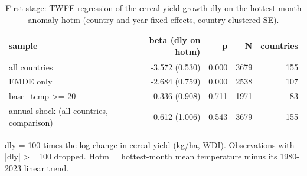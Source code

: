 \begin{table}[htbp]
\centering
\caption{First stage: TWFE regression of the cereal-yield growth dly on the hottest-month anomaly hotm (country and year fixed effects, country-clustered SE).}
\label{tab:agri_firststage}
\begin{tabular}{lrrrr}
\toprule
sample & beta (dly on hotm) & p & N & countries \\
\midrule
all countries & -3.572 (0.530) & 0.000 & 3679 & 155 \\
EMDE only & -2.684 (0.759) & 0.000 & 2538 & 107 \\
base\_temp >= 20 & -0.336 (0.908) & 0.711 & 1971 & 83 \\
annual shock (all countries, comparison) & -0.612 (1.006) & 0.543 & 3679 & 155 \\
\bottomrule
\end{tabular}
\par\smallskip\footnotesize dly = 100 times the log change in cereal yield (kg/ha, WDI). Observations with |dly| >= 100 dropped. Hotm = hottest-month mean temperature minus its 1980-2023 linear trend.
\end{table}
